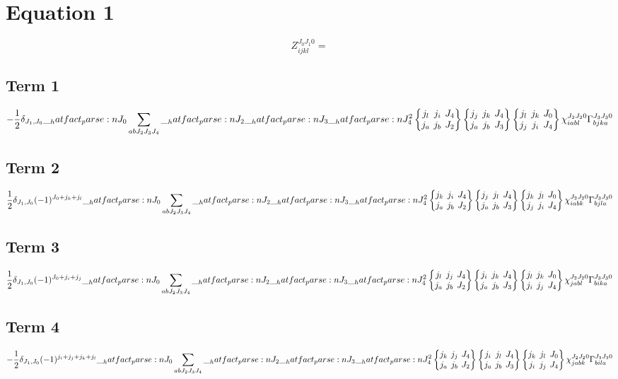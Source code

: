 \documentclass{scrartcl}
\newcommand{\sixj}[6]{\begingroup\setlength{\arraycolsep}{0.2em}\begin{Bmatrix} #1 & #2 & #3 \\ #4 & #5 & #6 \end{Bmatrix}\endgroup}
\begin{document}
\section{Equation 1}
\begin{dmath*}
Z_{i j k l}^{{J}_{0} {J}_{1} 0} = 
\end{dmath*}
\subsection{Term 1}
\begin{dmath*}
-\frac{1}{2} \* \delta_{{J}_{1},{J}_{0}} \* \hatfact{{J}_{0}} \* \sum_{a b {J}_{2} {J}_{3} {J}_{4}} \* \hatfact{{J}_{2}} \* \hatfact{{J}_{3}} \* \hatfact{{J}_{4}^{2}} \* \sixj{{j}_{l}}{{j}_{i}}{{J}_{4}}{{j}_{a}}{{j}_{b}}{{J}_{2}} \* \sixj{{j}_{j}}{{j}_{k}}{{J}_{4}}{{j}_{a}}{{j}_{b}}{{J}_{3}} \* \sixj{{j}_{l}}{{j}_{k}}{{J}_{0}}{{j}_{j}}{{j}_{i}}{{J}_{4}} \* \chi_{i a b l}^{{J}_{2} {J}_{2} 0} \* \Gamma_{b j k a}^{{J}_{3} {J}_{3} 0}
\end{dmath*}
\subsection{Term 2}
\begin{dmath*}
\frac{1}{2} \* \delta_{{J}_{1},{J}_{0}} \* (-1)^{{J}_{0}+{j}_{k}+{j}_{l}} \* \hatfact{{J}_{0}} \* \sum_{a b {J}_{2} {J}_{3} {J}_{4}} \* \hatfact{{J}_{2}} \* \hatfact{{J}_{3}} \* \hatfact{{J}_{4}^{2}} \* \sixj{{j}_{k}}{{j}_{i}}{{J}_{4}}{{j}_{a}}{{j}_{b}}{{J}_{2}} \* \sixj{{j}_{j}}{{j}_{l}}{{J}_{4}}{{j}_{a}}{{j}_{b}}{{J}_{3}} \* \sixj{{j}_{k}}{{j}_{l}}{{J}_{0}}{{j}_{j}}{{j}_{i}}{{J}_{4}} \* \chi_{i a b k}^{{J}_{2} {J}_{2} 0} \* \Gamma_{b j l a}^{{J}_{3} {J}_{3} 0}
\end{dmath*}
\subsection{Term 3}
\begin{dmath*}
\frac{1}{2} \* \delta_{{J}_{1},{J}_{0}} \* (-1)^{{J}_{0}+{j}_{i}+{j}_{j}} \* \hatfact{{J}_{0}} \* \sum_{a b {J}_{2} {J}_{3} {J}_{4}} \* \hatfact{{J}_{2}} \* \hatfact{{J}_{3}} \* \hatfact{{J}_{4}^{2}} \* \sixj{{j}_{l}}{{j}_{j}}{{J}_{4}}{{j}_{a}}{{j}_{b}}{{J}_{2}} \* \sixj{{j}_{i}}{{j}_{k}}{{J}_{4}}{{j}_{a}}{{j}_{b}}{{J}_{3}} \* \sixj{{j}_{l}}{{j}_{k}}{{J}_{0}}{{j}_{i}}{{j}_{j}}{{J}_{4}} \* \chi_{j a b l}^{{J}_{2} {J}_{2} 0} \* \Gamma_{b i k a}^{{J}_{3} {J}_{3} 0}
\end{dmath*}
\subsection{Term 4}
\begin{dmath*}
-\frac{1}{2} \* \delta_{{J}_{1},{J}_{0}} \* (-1)^{{j}_{i}+{j}_{j}+{j}_{k}+{j}_{l}} \* \hatfact{{J}_{0}} \* \sum_{a b {J}_{2} {J}_{3} {J}_{4}} \* \hatfact{{J}_{2}} \* \hatfact{{J}_{3}} \* \hatfact{{J}_{4}^{2}} \* \sixj{{j}_{k}}{{j}_{j}}{{J}_{4}}{{j}_{a}}{{j}_{b}}{{J}_{2}} \* \sixj{{j}_{i}}{{j}_{l}}{{J}_{4}}{{j}_{a}}{{j}_{b}}{{J}_{3}} \* \sixj{{j}_{k}}{{j}_{l}}{{J}_{0}}{{j}_{i}}{{j}_{j}}{{J}_{4}} \* \chi_{j a b k}^{{J}_{2} {J}_{2} 0} \* \Gamma_{b i l a}^{{J}_{3} {J}_{3} 0}
\end{dmath*}
\end{document}
